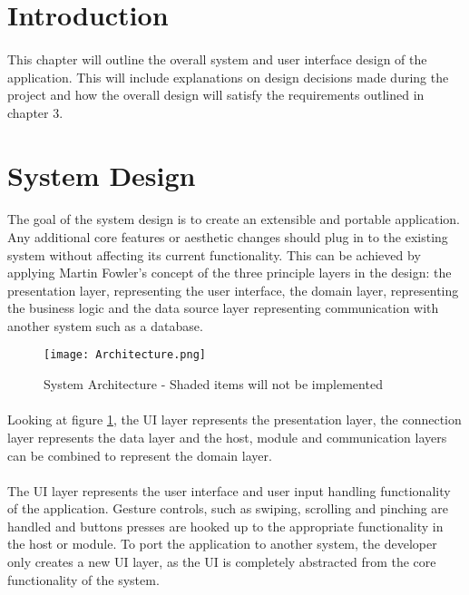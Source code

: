\section{Introduction}
	\paragraph{}{
	This chapter will outline the overall system and user interface design of the application. This will include explanations on design decisions made during the project and how the overall design will satisfy the requirements outlined in chapter 3.
	}

\section{System Design}
	\paragraph{}{
	The goal of the system design is to create an extensible and portable application. Any additional core features or aesthetic changes should plug in to the existing system without affecting its current functionality. This can be achieved by applying Martin Fowler's concept of the three principle layers in the design: the presentation layer, representing the user interface, the domain layer, representing the business logic and the data source layer representing communication with another system such as a database.\cite{Fowler}
	}
	\begin{figure}[h]
		\begin{center}
			\texttt{[image: Architecture.png]}
			\caption{System Architecture - Shaded items will not be implemented}
			\label{fig:Architecture}
		\end{center}
	\end{figure}
	\paragraph{}{
	Looking at figure \ref{fig:Architecture}, the UI layer represents the presentation layer, the connection layer represents the data layer and the host, module and communication layers can be combined to represent the domain layer.
	}	
	
	\paragraph{}{
	The UI layer represents the user interface and user input handling functionality of the application. Gesture controls, such as swiping, scrolling and pinching are handled and buttons presses are hooked up to the appropriate functionality in the host or module. To port the application to another system, the developer only creates a new UI layer, as the UI is completely abstracted from the core functionality of the system.
	}	
	
